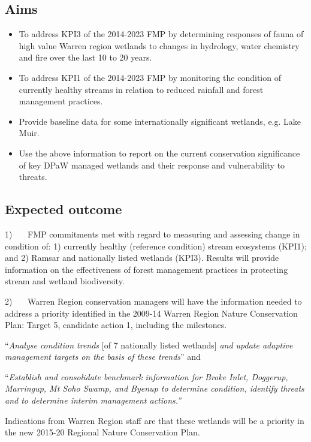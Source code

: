 \documentclass[version=last,
    paper=a4, %
    10pt, %
    usenames,
    dvipsnames,
    oneside, %
    headings=openany, %
    DIV=15 %
]{scrbook}
\begin{document}
\subsection*{Aims}
\begin{itemize}
\item
  To address KPI3 of the 2014-2023 FMP by determining responses of fauna
  of high value Warren region wetlands to changes in hydrology, water
  chemistry and fire over the last 10 to 20 years.
\item
  To address KPI1 of the 2014-2023 FMP by monitoring the condition of
  currently healthy streams in relation to reduced rainfall and forest
  management practices.
\item
  Provide baseline data for some internationally significant wetlands,
  e.g. Lake Muir.
\item
  Use the above information to report on the current conservation
  significance of key DPaW managed wetlands and their response and
  vulnerability to threats.
\end{itemize}



\subsection*{Expected outcome}
1)~~~ FMP commitments met with regard to measuring and assessing change
in condition of: 1) currently healthy (reference condition) stream
ecosystems (KPI1); and 2) Ramsar and nationally listed wetlands (KPI3).
Results will provide information on the effectiveness of forest
management practices in protecting stream and wetland biodiversity.

2)~~~ Warren Region conservation managers will have the information
needed to address a priority identified in the 2009-14 Warren Region
Nature Conservation Plan: Target 5, candidate action 1, including the
milestones.

``\emph{Analyse condition trends} {[}of 7 nationally listed wetlands{]}
\emph{and update adaptive management targets on the basis of these
trends}'' and

``\emph{Establish and consolidate benchmark information for Broke Inlet,
Doggerup, Marringup, Mt Soho Swamp, and Byenup to determine condition,
identify threats and to determine interim management actions}\emph{.''}

Indications from Warren Region staff are that these wetlands will be a
priority in the new 2015-20 Regional Nature Conservation Plan.
\end{document}
